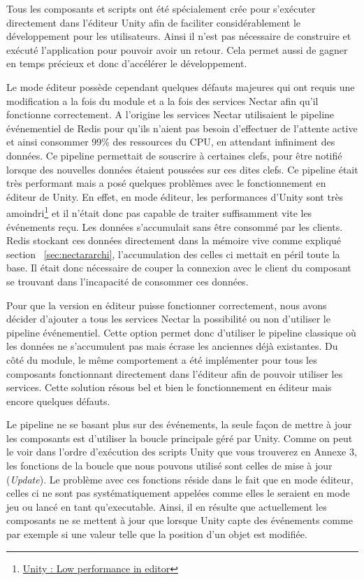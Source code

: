 Tous les composants et scripts ont été spécialement crée pour s'exécuter directement dans l'éditeur Unity afin de faciliter considérablement le développement pour les utilisateurs. Ainsi il n'est pas nécessaire de construire et exécuté l'application pour pouvoir avoir un retour. Cela permet aussi de gagner en temps précieux et donc d'accélérer le développement.

Le mode éditeur possède cependant quelques défauts majeures qui ont requis une modification a la fois du module et a la fois des services Nectar afin qu'il fonctionne correctement. 
A l'origine les services Nectar utilisaient le pipeline événementiel de Redis pour qu'ils n'aient pas besoin d'effectuer de l'attente active et ainsi consommer 99\% des ressources du CPU, en attendant infiniment des données. Ce pipeline permettait de souscrire à certaines clefs, pour être notifié lorsque des nouvelles données étaient poussées sur ces dites clefs. Ce pipeline était très performant mais a posé quelques problèmes avec le fonctionnement en éditeur de Unity. En effet, en mode éditeur, les performances d'Unity sont très amoindri\footnote{\href{https://forum.unity.com/threads/low-performance-in-editor-but-working-fine-in-build.489030/}{Unity : Low performance in editor}} et il n'était donc pas capable de traiter suffisamment vite les événements reçu. Les données s'accumulait sans être consommé par les clients. Redis stockant ces données directement dans la mémoire vive comme expliqué section ~\ref{sec:nectararchi}, l'accumulation des celles ci mettait en péril toute la base. Il était donc nécessaire de couper la connexion avec le client du composant se trouvant dans l'incapacité de consommer ces données.

Pour que la version en éditeur puisse fonctionner correctement, nous avons décider d'ajouter a tous les services Nectar la possibilité ou non d'utiliser le pipeline événementiel. Cette option permet donc d'utiliser le pipeline classique où les données ne s'accumulent pas mais écrase les anciennes déjà existantes. Du côté du module, le même comportement a été implémenter pour tous les composants fonctionnant directement dans l'éditeur afin de pouvoir utiliser les services. Cette solution résous bel et bien le fonctionnement en éditeur mais encore quelques défauts.

Le pipeline ne se basant plus sur des événements, la seule façon de mettre à jour les composants est d'utiliser la boucle principale géré par Unity. Comme on peut le voir dans l'ordre d'exécution des scripts Unity que vous trouverez en Annexe 3, les fonctions de la boucle que nous pouvons utilisé sont celles de mise à jour (\emph{Update}). Le problème avec ces fonctions réside dans le fait que en mode éditeur, celles ci ne sont pas systématiquement appelées comme elles le seraient en mode jeu ou lancé en tant qu'executable. Ainsi, il en résulte que actuellement les composants ne se mettent à jour que lorsque Unity capte des événements comme par exemple si une valeur telle que la position d'un objet est modifiée.\\

